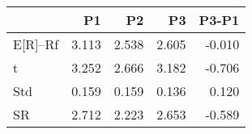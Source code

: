 \begin{tabular}{lrrrr}
\toprule
 & P1 & P2 & P3 & P3-P1 \\
\midrule
E[R]--Rf & 3.113 & 2.538 & 2.605 & -0.010 \\
t & 3.252 & 2.666 & 3.182 & -0.706 \\
Std & 0.159 & 0.159 & 0.136 & 0.120 \\
SR & 2.712 & 2.223 & 2.653 & -0.589 \\
\bottomrule
\end{tabular}
